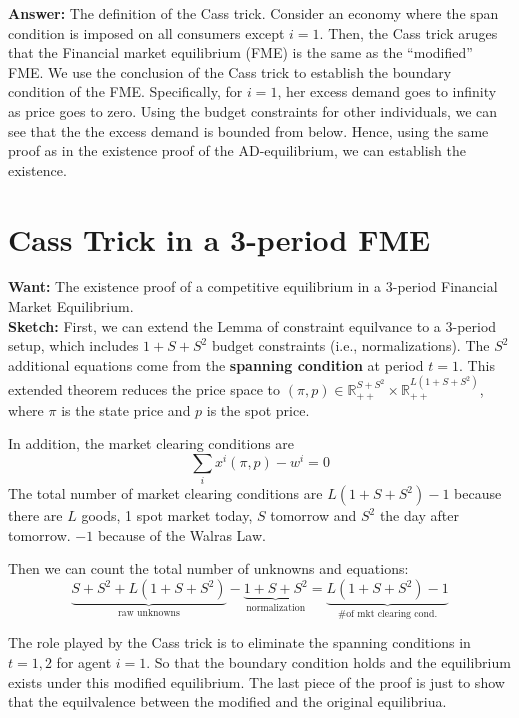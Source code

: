 \textbf{Answer:} 
The definition of the Cass trick. 
Consider an economy where the span condition is imposed on all consumers except $i=1$.
Then, the Cass trick aruges that the Financial market equilibrium (FME) is the same as the 
``modified'' FME.
We use the conclusion of the Cass trick to establish the boundary condition of the FME.
Specifically, for $i=1$, her excess demand goes to infinity as price goes to zero.
Using the budget constraints for other individuals, we can see that the 
the excess demand is bounded from below. 
Hence, using the same proof as in the existence proof of the AD-equilibrium, 
we can establish the existence. 




\section{Cass Trick in a 3-period FME}
\textbf{Want: } The existence proof of a competitive equilibrium in a 3-period Financial Market Equilibrium.
\\
\noindent \textbf{Sketch: }  First, we can extend the Lemma of constraint equilvance to a 3-period setup,
which includes $1 + S + S^2$ budget constraints (i.e., normalizations).
The $S^2$ additional equations come from the \textbf{spanning condition} 
at period $t = 1$.
This extended theorem reduces the price space to 
$(\pi, p) \in \mathbb{R}_{++}^{S+S^2} \times \mathbb{R}_{++}^{L(1 + S+S^2)}$,
where $\pi$ is the state price and $p$ is the spot price. 


In addition, the market clearing conditions are 
\[
\sum_i x^i(\pi, p) - w^i = 0
\]
The total number of market clearing conditions are $L(1 + S+S^2) -1$
because there are $L$ goods, 1 spot market today, $S$ tomorrow and $S^2$ the day after tomorrow. 
$-1$ because of the Walras Law.

Then we can count the total number of unknowns and equations:
\[
\underbrace{S+S^2 + L(1 + S+S^2)}_{\text{raw unknowns}} - \underbrace{1 + S + S^2}_{\text{normalization}} = \underbrace{L (1 + S + S^2) - 1}_{\text{\# of mkt clearing cond.}}
\]


The role played by the Cass trick is to eliminate the spanning conditions in $t =1, 2$ for agent $i=1$.
So that the boundary condition holds and the equilibrium exists under this modified equilibrium.
The last piece of the proof is just to show that the equilvalence between the modified and the original equilibriua.




